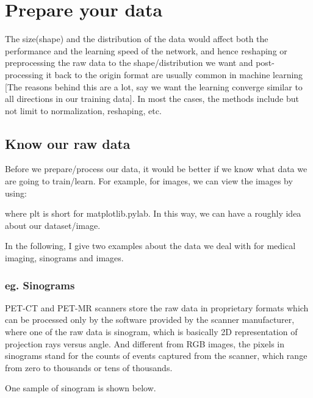 \documentclass[letterpaper,10pt,english]{sphinxmanual}
\begin{document}
\section{Prepare your data}
\label{\detokenize{usage/data:prepare-your-data}}\label{\detokenize{usage/data::doc}}
The size(shape) and the distribution of the data would affect both the performance and the learning speed of the network, and hence reshaping or preprocessing the raw data to the shape/distribution we want and post-processing it back to the origin format are usually common in machine learning {[}The reasons behind this are a lot, say we want the learning converge similar to all directions in our training data{]}. In most the cases, the methods include but not limit to normalization, reshaping, etc.


\subsection{Know our raw data}
\label{\detokenize{usage/data:know-our-raw-data}}
Before we prepare/process our data, it would be better if we know what data we are going to train/learn. For example, for images, we can view the images by using:

%
\begin{sphinxVerbatim}[commandchars=\\\{\}]
\end{sphinxVerbatim}

where plt is short for matplotlib.pylab. In this way, we can have a roughly idea about our dataset/image.

In the following, I give two examples about the data we deal with for medical imaging, sinograms and images.


\subsubsection{eg. Sinograms}
\label{\detokenize{usage/data:eg-sinograms}}
PET-CT and PET-MR scanners store the raw data in proprietary formats which can be processed only by the software provided by the scanner manufacturer, where one of the raw data is sinogram, which is basically 2D representation of projection rays versus angle. And different from RGB images, the pixels in sinograms stand for the counts of events captured from the scanner, which range from zero to thousands or tens of thousands.

One sample of sinogram is shown below.
\end{document}
